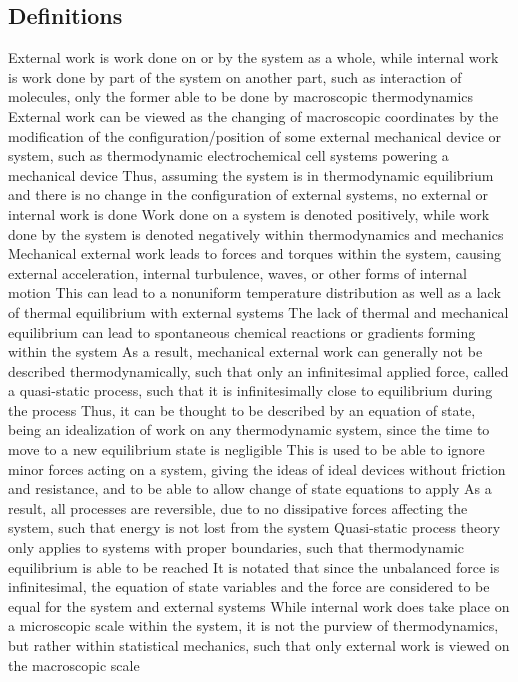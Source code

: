 \documentclass[11 pt, twoside]{article}
\newenvironment{outline*}
{
	\begin{outline}[enumerate]
	}
	{\end{outline}
}
\begin{document}
\subsection{Definitions}
\begin{outline*}
\1 External work is work done on or by the system as a whole, while internal work is work done by part of the system on another part, such as interaction of molecules, only the former able to be done by macroscopic thermodynamics
\2 External work can be viewed as the changing of macroscopic coordinates by the modification of the configuration/position of some external mechanical device or system, such as thermodynamic electrochemical cell systems powering a mechanical device
\3 Thus, assuming the system is in thermodynamic equilibrium and there is no change in the configuration of external systems, no external or internal work is done
\2 Work done on a system is denoted positively, while work done by the system is denoted negatively within thermodynamics and mechanics
\1 Mechanical external work leads to forces and torques within the system, causing external acceleration, internal turbulence, waves, or other forms of internal motion
\2 This can lead to a nonuniform temperature distribution as well as a lack of thermal equilibrium with external systems
\3 The lack of thermal and mechanical equilibrium can lead to spontaneous chemical reactions or gradients forming within the system
\2 As a result, mechanical external work can generally not be described thermodynamically, such that only an infinitesimal applied force, called a quasi-static process, such that it is infinitesimally close to equilibrium during the process
\3 Thus, it can be thought to be described by an equation of state, being an idealization of work on any thermodynamic system, since the time to move to a new equilibrium state is negligible
\3 This is used to be able to ignore minor forces acting on a system, giving the ideas of ideal devices without friction and resistance, and to be able to allow change of state equations to apply
\3 As a result, all processes are reversible, due to no dissipative forces affecting the system, such that energy is not lost from the system
\2 Quasi-static process theory only applies to systems with proper boundaries, such that thermodynamic equilibrium is able to be reached
\2 It is notated that since the unbalanced force is infinitesimal, the equation of state variables and the force are considered to be equal for the system and external systems
\1 While internal work does take place on a microscopic scale within the system, it is not the purview of thermodynamics, but rather within statistical mechanics, such that only external work is viewed on the macroscopic scale
\end{outline*}
\end{document}
